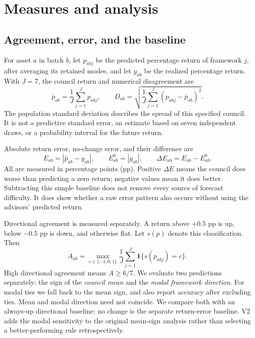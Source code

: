 \documentclass[11pt]{article}
\begin{document}
\section{Measures and analysis}
\subsection{Agreement, error, and the baseline}
For asset $a$ in batch $b$, let $p_{abj}$ be the predicted percentage return of framework $j$, after averaging its retained modes, and let $y_{ab}$ be the realized percentage return. With $J=7$, the council return and numerical disagreement are
\begin{equation}
\bar p_{ab}=\frac{1}{J}\sum_{j=1}^{J}p_{abj},\qquad
D_{ab}=\sqrt{\frac{1}{J}\sum_{j=1}^{J}(p_{abj}-\bar p_{ab})^2}.
\end{equation}
The population standard deviation describes the spread of this specified council. It is not a predictive standard error, an estimate based on seven independent draws, or a probability interval for the future return.

Absolute return error, no-change error, and their difference are
\begin{equation}
E_{ab}=|\bar p_{ab}-y_{ab}|,\qquad E^0_{ab}=|y_{ab}|,\qquad
\Delta E_{ab}=E_{ab}-E^0_{ab}.
\end{equation}
All are measured in percentage points (pp). Positive $\Delta E$ means the council does worse than predicting a zero return; negative values mean it does better. Subtracting this simple baseline does not remove every source of forecast difficulty. It does show whether a raw error pattern also occurs without using the advisors' predicted return.

Directional agreement is measured separately. A return above $+0.5$ pp is up, below $-0.5$ pp is down, and otherwise flat. Let $s(p)$ denote this classification. Then
\begin{equation}
A_{ab}=\max_{c\in\{-1,0,1\}}\frac{1}{J}\sum_{j=1}^{J}\mathbf{1}\{s(p_{abj})=c\}.
\end{equation}
High directional agreement means $A\geq6/7$. We evaluate two predictions separately: the sign of the \emph{council mean} and the \emph{modal framework direction}. For modal ties we fall back to the mean sign, and also report accuracy after excluding ties. Mean and modal direction need not coincide. We compare both with an always-up directional baseline; no change is the separate return-error baseline. V2 adds the modal sensitivity to the original mean-sign analysis rather than selecting a better-performing rule retrospectively.
\end{document}
